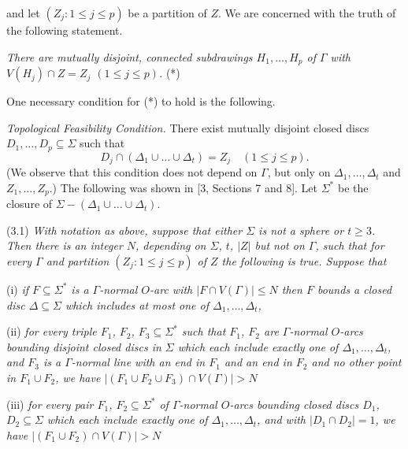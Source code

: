 \noindent and let $(Z_j \colon 1 \le j \le p)$ be a partition of $Z$. We are concerned with the truth of the following statement.

\textit{There are mutually disjoint, connected subdrawings $H_1, \dots, H_p$ of $\Gamma$ with $V(H_j) \cap Z = Z_j$ $(1 \le j \le p)$.} (*)

One necessary condition for (*) to hold is the following.

\textit{Topological Feasibility Condition.} There exist mutually disjoint closed discs $D_1, \dots, D_p \subseteq \Sigma$ such that
\begin{equation*}
D_j \cap (\Delta_1 \cup \dots \cup \Delta_t) = Z_j \quad (1 \le j \le p).
\end{equation*}
(We observe that this condition does not depend on $\Gamma$, but only on $\Delta_1, \dots, \Delta_t$ and $Z_1, \dots, Z_p$.) The following was shown in [3, Sections 7 and 8]. Let $\Sigma^*$ be the closure of $\Sigma - (\Delta_1 \cup \dots \cup \Delta_t)$.

\stmt
(3.1) \textit{With notation as above, suppose that either $\Sigma$ is not a sphere or $t \ge 3$. Then there is an integer $N$, depending on $\Sigma$, $t$, $|Z|$ but not on $\Gamma$, such that for every $\Gamma$ and partition $(Z_j \colon 1 \le j \le p)$ of $Z$ the following is true. Suppose that}

\hspace*{12pt}(i) \textit{if $F \subseteq \Sigma^*$ is a $\Gamma$-normal $O$-arc with $|F \cap V(\Gamma)| \le N$ then $F$ bounds a closed disc $\Delta \subseteq \Sigma$ which includes at most one of $\Delta_1, \dots, \Delta_t$,}

\hspace*{12pt}(ii) \textit{for every triple $F_1$, $F_2$, $F_3 \subseteq \Sigma^*$ such that $F_1$, $F_2$ are $\Gamma$-normal $O$-arcs bounding disjoint closed discs in $\Sigma$ which each include exactly one of $\Delta_1, \dots, \Delta_t$, and $F_3$ is a $\Gamma$-normal line with an end in $F_1$ and an end in $F_2$ and no other point in $F_1 \cup F_2$, we have $|(F_1 \cup F_2 \cup F_3) \cap V(\Gamma)| > N$}

\hspace*{12pt}(iii) \textit{for every pair $F_1$, $F_2 \subseteq \Sigma^*$ of $\Gamma$-normal $O$-arcs bounding closed discs $D_1$, $D_2 \subseteq \Sigma$ which each include exactly one of $\Delta_1, \dots, \Delta_t$, and with $|D_1 \cap D_2| = 1$, we have $|(F_1 \cup F_2) \cap V(\Gamma)| > N$}

